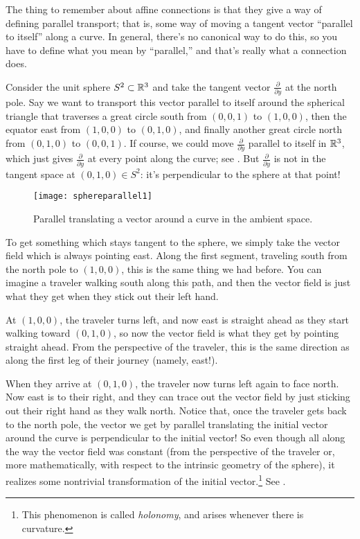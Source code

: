 The thing to remember about affine connections is that they give a way of defining parallel transport; that is, some way of moving a tangent vector ``parallel to itself'' along a curve. In general, there's no canonical way to do this, so you have to define what you mean by ``parallel,'' and that's really what a connection does.

\begin{example}
	Consider the unit sphere $S^2 \subset \mathbb{R}^3$ and take the tangent vector $\frac{\partial}{\partial y}$ at the north pole. Say we want to transport this vector parallel to itself around the spherical triangle that traverses a great circle south from $(0,0,1)$ to $(1,0,0)$, then the equator east from $(1,0,0)$ to $(0,1,0)$, and finally another great circle north from $(0,1,0)$ to $(0,0,1)$. If course, we could move $\frac{\partial}{\partial y}$ parallel to itself in $\mathbb{R}^3$, which just gives $\frac{\partial}{\partial y}$ at every point along the curve; see . But $\frac{\partial}{\partial y}$ is not in the tangent space at $(0,1,0) \in S^2$: it's perpendicular to the sphere at that point!
	
	\begin{figure}[htbp]
		\centering
			\texttt{[image: sphereparallel1]}
		\caption{Parallel translating a vector around a curve in the ambient space.}
		\label{fig:sphereparallel1}
	\end{figure}
	
	To get something which stays tangent to the sphere, we simply take the vector field which is always pointing east. Along the first segment, traveling south from the north pole to $(1,0,0)$, this is the same thing we had before. You can imagine a traveler walking south along this path, and then the vector field is just what they get when they stick out their left hand.
	
	At $(1,0,0)$, the traveler turns left, and now east is straight ahead as they start walking toward $(0,1,0)$, so now the vector field is what they get by pointing straight ahead. From the perspective of the traveler, this is the same direction as along the first leg of their journey (namely, east!).
	
	When they arrive at $(0,1,0)$, the traveler now turns left again to face north. Now east is to their right, and they can trace out the vector field by just sticking out their right hand as they walk north. Notice that, once the traveler gets back to the north pole, the vector we get by parallel translating the initial vector around the curve is perpendicular to the initial vector! So even though all along the way the vector field was constant (from the perspective of the traveler or, more mathematically, with respect to the intrinsic geometry of the sphere), it realizes some nontrivial transformation of the initial vector.\footnote{This phenomenon is called \emph{holonomy}, and arises whenever there is curvature.} See .
	

\end{example}
